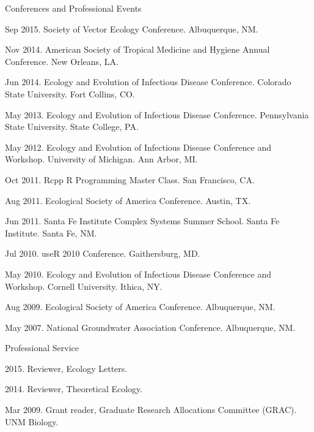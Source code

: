 \documentclass{resume} %
\begin{document}
\begin{rSection}{Conferences and Professional Events}
\item Sep 2015. Society of Vector Ecology Conference.  Albuquerque, NM.
\item Nov 2014. American Society of Tropical Medicine and Hygiene Annual
Conference.  New Orleans, LA.
\item Jun 2014. Ecology and Evolution of Infectious Disease Conference.
Colorado State University.  Fort Collins, CO.
\item May 2013. Ecology and Evolution of Infectious Disease Conference.
Pennsylvania State University.  State College, PA.
\item May 2012. Ecology and Evolution of Infectious Disease Conference
and Workshop.  University of Michigan.  Ann Arbor, MI.
\item Oct 2011. Rcpp R Programming Master Class. San Francisco, CA.
\item Aug 2011. Ecological Society of America Conference. Austin, TX.
\item Jun 2011. Santa Fe Institute Complex Systems Summer School. Santa Fe Institute. Santa Fe, NM. 
\item Jul 2010.  useR 2010 Conference. Gaithersburg, MD. 
\item May 2010. Ecology and Evolution of Infectious Disease Conference
and Workshop.  Cornell University.  Ithica, NY.
\item Aug 2009. Ecological Society of America Conference. Albuquerque, NM.
\item May 2007. National Groundwater Association Conference. Albuquerque, NM. 
\end{rSection}

\begin{rSection}{Professional Service}
\item 2015. Reviewer, Ecology Letters.
\item 2014. Reviewer, Theoretical Ecology.
\item Mar 2009. Grant reader, Graduate Research Allocations Committee (GRAC). UNM Biology.
\end{rSection}
\end{document}
